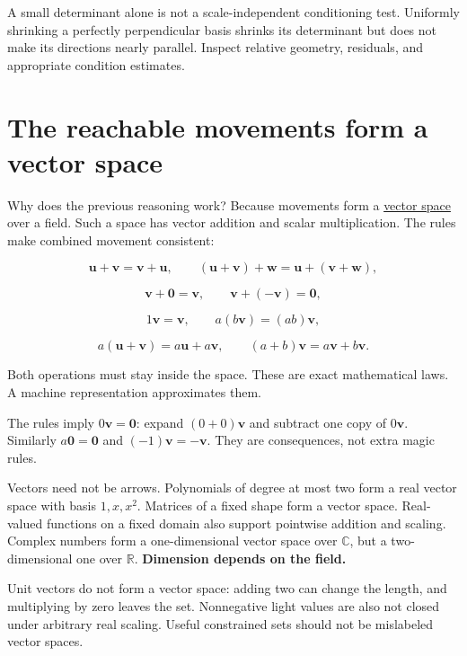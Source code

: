 A small determinant alone is not a scale-independent conditioning test. Uniformly shrinking a perfectly perpendicular basis shrinks its determinant but does not make its directions nearly parallel. Inspect relative geometry, residuals, and appropriate condition estimates.

\section{The reachable movements form a vector space}\label{01-foundations-i-ch017-the-reachable-movements-form-a-vector-space}

Why does the previous reasoning work? Because movements form a \hyperref[01-foundations-i-ch017-the-reachable-movements-form-a-vector-space]{vector space} over a field. Such a space has vector addition and scalar multiplication. The rules make combined movement consistent:

\[
\mathbf u+\mathbf v=\mathbf v+\mathbf u,\qquad
(\mathbf u+\mathbf v)+\mathbf w=\mathbf u+(\mathbf v+\mathbf w),
\]

\[
\mathbf v+\mathbf0=\mathbf v,\qquad
\mathbf v+(-\mathbf v)=\mathbf0,
\]

\[
1\mathbf v=\mathbf v,\qquad
a(b\mathbf v)=(ab)\mathbf v,
\]

\[
a(\mathbf u+\mathbf v)=a\mathbf u+a\mathbf v,\qquad
(a+b)\mathbf v=a\mathbf v+b\mathbf v.
\]

Both operations must stay inside the space. These are exact mathematical laws. A machine representation approximates them.

The rules imply \(0\mathbf v=\mathbf0\): expand \((0+0)\mathbf v\) and subtract one copy of \(0\mathbf v\). Similarly \(a\mathbf0=\mathbf0\) and \((-1)\mathbf v=-\mathbf v\). They are consequences, not extra magic rules.

Vectors need not be arrows. Polynomials of degree at most two form a real vector space with basis \(1,x,x^2\). Matrices of a fixed shape form a vector space. Real-valued functions on a fixed domain also support pointwise addition and scaling. Complex numbers form a one-dimensional vector space over \(\mathbb C\), but a two-dimensional one over \(\mathbb R\). \textbf{Dimension depends on the field.}

Unit vectors do not form a vector space: adding two can change the length, and multiplying by zero leaves the set. Nonnegative light values are also not closed under arbitrary real scaling. Useful constrained sets should not be mislabeled vector spaces.

